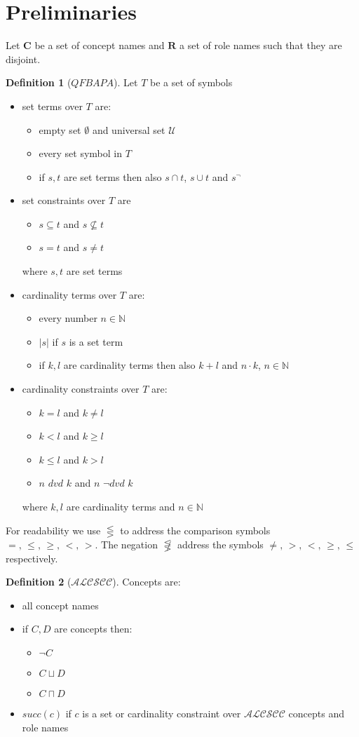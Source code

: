 \documentclass[a4paper,11pt]{scrartcl}
\theoremstyle{break}
\theoremstyle{definition}
\newtheorem{mydef}{Definition}
\begin{document}
\section{Preliminaries}
Let $\mathbf{C}$ be a set of concept names and $\mathbf{R}$ a set of role names such that they are disjoint.
\begin{mydef}[$QFBAPA$]
Let $T$ be a set of symbols
\begin{itemize}
\item set terms over $T$ are:
\begin{itemize}
\item empty set $\emptyset$ and universal set $
\mathcal{U}$
\item every set symbol in $T$
\item if $s,t$ are set terms then also $s\cap t$, $s\cup t$ and $s^{\neg}$
\end{itemize}
\item set constraints over $T$ are
\begin{itemize}
\item $s\subseteq t$ and $s\not\subseteq t$
\item $s=t$ and $s\neq t$
\end{itemize}
where $s,t$ are set terms
\item cardinality terms over $T$ are:
\begin{itemize}
\item every number $n\in \mathbb{N}$
\item $|s|$ if $s$ is a set term
\item if $k,l$ are cardinality terms then also $k+l$ and $n\cdot k$, $n\in \mathbb{N}$
\end{itemize}
\item cardinality constraints over $T$ are:
\begin{itemize}
\item $k=l$ and $k\neq l$
\item $k<l$ and $k\geq l$
\item $k\leq l$ and $k>l$
\item $n$ $dvd$ $k$ and $n$ $\neg dvd$ $k$
\end{itemize}
where $k,l$ are cardinality terms and $n\in\mathbb{N}$
\end{itemize}
For readability we use $\lesseqgtr$ to address the comparison symbols $=,\,\leq,\,\geq,\,<,\,>$. The negation $\not\lesseqgtr$ address the symbols $\neq,\,>,\,<,\,\geq,\,\leq$ respectively.
\end{mydef}
\begin{mydef}[$\mathcal{ALCSCC}$]
Concepts are:
\begin{itemize}
\item all concept names
\item if $C,D$ are concepts then:
\begin{itemize}
\item $\neg C$
\item $C\sqcup D$
\item $C\sqcap D$
\end{itemize}
\item $succ(c)$ if $c$ is a set or cardinality constraint over $\mathcal{ALCSCC}$ concepts and role names
\end{itemize}
\end{mydef}
\end{document}
